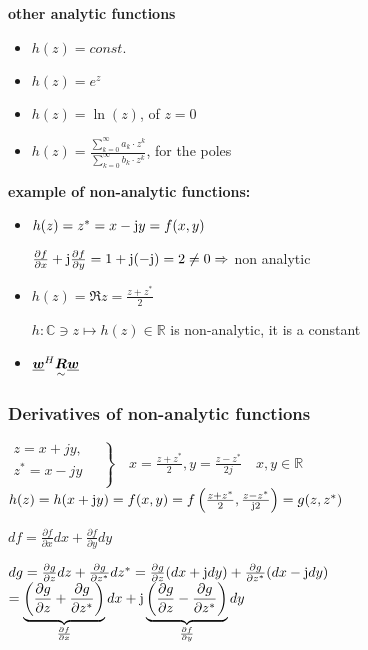 \textbf{other analytic functions}

\begin{itemize}
\item $h(z)=const.$
\item $h(z)=e^z$
\item $h(z)=\ln (z)$,  of $z=0$
\item $h(z)=\frac{\sum_{k=0}^\infty a_k \cdot z^k}{\sum_{k=0}^\infty b_k \cdot z^k}$,  for the poles
\end{itemize}

\textbf{example of non-analytic functions:}
\begin{itemize}
\item $h(z)=z^*=x-\mathrm{j} y=f(x,y)$

$\frac{\partial f}{\partial x}+\mathrm{j} \frac{\partial f}{\partial y}= 1 +\mathrm{j} (-\mathrm{j}) =2 \neq 0 \Rightarrow $ non analytic
\item $h(z)=\Re{z}=\frac{z+z^*}{2}$

$h:\mathbb{C}\ni z\mapsto h(z)\in\mathbb{R}$ is non-analytic,  it is a constant
\item $\underline{\boldsymbol {w}}^H\underset{\sim}{\boldsymbol {R}}\underline{\boldsymbol {w}}$
\end{itemize}



\subsubsection{Derivatives of non-analytic functions }



$\left. \begin{array}{l}z= x+jy, \quad\\z^*= x-jy\\ \end{array}\right\rbrace \quad x=\frac{z+z^*}{2},  y=\frac{z-z^*}{2j} \quad x,y \in \mathbb{R}$\\

$h(z)=h(x+\mathrm{j} y)=f(x,y)=f\left(\frac{z+z^*}{2},\frac{z-z^*}{\mathrm{j} 2}\right)=g(z,z^*)$

$df=\frac{\partial f}{\partial x}dx+\frac{\partial f}{\partial y}dy$

$dg=\frac{\partial g}{\partial z}dz+\frac{\partial g}{\partial z^*}dz^* =\frac{\partial g}{\partial z}(dx+\mathrm{j} dy)+\frac{\partial g}{\partial z^*}(dx-\mathrm{j} dy) $
$=\underbrace{\left(\frac{\partial g}{\partial z}+\frac{\partial g}{\partial z^*}\right)}_{\frac{\partial f}{\partial x}}dx
+\mathrm{j} \underbrace{\left(\frac{\partial g}{\partial z}-\frac{\partial g}{\partial z^*}\right)}_{\frac{\partial f}{\partial y}}dy$


